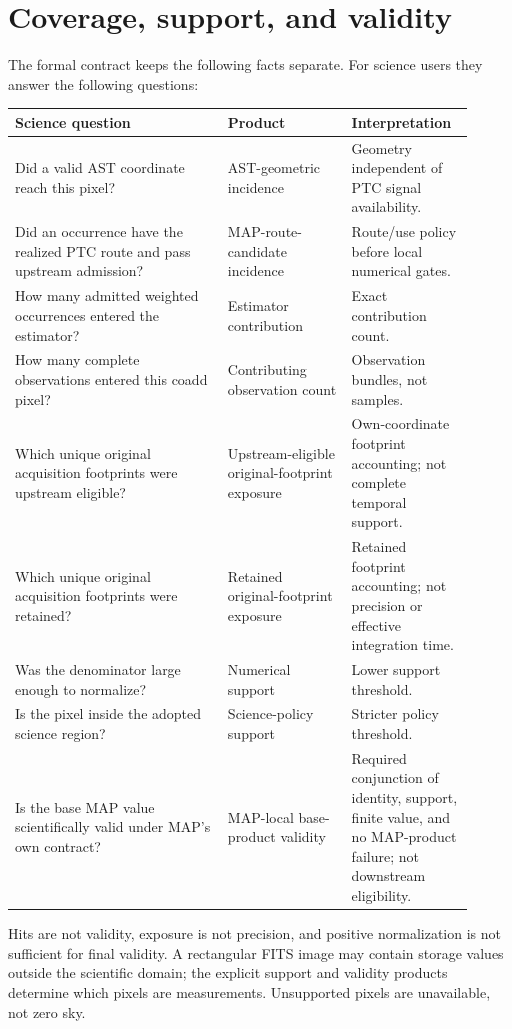 \documentclass[10pt]{article}
\begin{document}
\section{Coverage, support, and validity}\label{sec:validity}
The formal contract keeps the following facts separate. For science users they answer
the following questions:
\begin{longtable}{L{0.43\linewidth}L{0.25\linewidth}L{0.23\linewidth}}
\toprule Science question & Product & Interpretation \\
\midrule
Did a valid AST coordinate reach this pixel? & AST-geometric incidence & Geometry independent of PTC signal availability.\\
Did an occurrence have the realized PTC route and pass upstream admission? & MAP-route-candidate incidence & Route/use policy before local numerical gates.\\
How many admitted weighted occurrences entered the estimator? & Estimator contribution & Exact contribution count.\\
How many complete observations entered this coadd pixel? & Contributing observation count & Observation bundles, not samples.\\
Which unique original acquisition footprints were upstream eligible? & Upstream-eligible original-footprint exposure & Own-coordinate footprint accounting; not complete temporal support.\\
Which unique original acquisition footprints were retained? & Retained original-footprint exposure & Retained footprint accounting; not precision or effective integration time.\\
Was the denominator large enough to normalize? & Numerical support & Lower support threshold.\\
Is the pixel inside the adopted science region? & Science-policy support & Stricter policy threshold.\\
Is the base MAP value scientifically valid under MAP's own contract? & MAP-local base-product validity & Required conjunction of identity, support, finite value, and no MAP-product failure; not downstream eligibility.\\
\bottomrule
\end{longtable}

Hits are not validity, exposure is not precision, and positive normalization
is not sufficient for final validity. A rectangular FITS image may contain
storage values outside the scientific domain; the explicit support and
validity products determine which pixels are measurements. Unsupported pixels
are unavailable, not zero sky.
\end{document}
